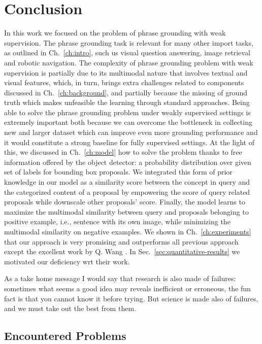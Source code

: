 \chapter{Conclusion}
\label{conclusion}

In this work we focused on the problem of phrase grounding with weak
supervision. The phrase grounding task is relevant for many other
import tasks, as outlined in Ch.~\ref{ch:intro}, such us visual
question answering, image retrieval and robotic navigation. The
complexity of phrase grounding problem with weak supervision is
partially due to its multimodal nature that involves textual and
visual features, which, in turn, brings extra challenges related to
components discussed in Ch.~\ref{ch:background}, and partially because
the missing of ground truth which makes unfeasible the learning
through standard approaches. Being able to solve the phrase grounding
problem under weakly supervised settings is extremely important both
because we can overcome the bottleneck in collecting new and larger
dataset which can improve even more grounding performance and it would
constitute a strong baseline for fully supervised settings. At the
light of this, we discussed in Ch.~\ref{ch:model} how to solve the
problem thanks to free information offered by the object detector: a
probability distribution over given set of labels for bounding box
proposals. We integrated this form of prior knowledge in our model as
a similarity score between the concept in query and the categorized
content of a proposal by empowering the score of query related
proposals while downscale other proposals' score. Finally, the model
learns to maximize the multimodal similarity between query and
proposals belonging to positive example, i.e., sentence with its own
image, while minimizing the multimodal similarity on negative
examples. We shown in Ch.~\ref{ch:experiments} that our approach is
very promising and outperforms all previous approach except the
excellent work by Q. Wang \etal{} \cite{wang2020maf}. In
Sec.~\ref{sec:quantitative-results} we motivated our deficiency wrt
their work. 

As a take home message I would say that research is also made of
failures: sometimes what seems a good idea may reveals inefficient or
erroneous, the fun fact is that you cannot know it before trying. But
science is made also of failures, and we must take out the best from
them.

\section{Encountered Problems}


